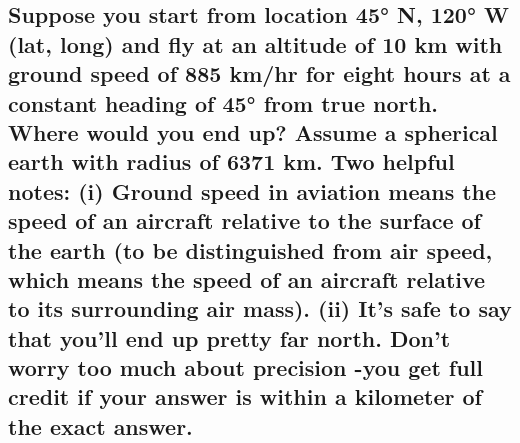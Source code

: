 \documentclass[12pt]{article}
\begin{document}
  \subsection
  {
    Suppose you start from location 45° N, 120° W (lat, long) and fly at an 
    altitude of 10 km with ground speed of 885 km/hr for eight hours at a 
    constant heading of 45° from true north. Where would you end up? Assume a 
    spherical earth with radius of 6371 km. Two helpful notes: (i) Ground speed 
    in aviation means the speed of an aircraft relative to the surface of the 
    earth (to be distinguished from air speed, which means the speed of an 
    aircraft relative to its surrounding air mass). (ii) It's safe to say that 
    you'll end up pretty far north. Don't worry too much about precision -you 
    get full credit if your answer is within a kilometer of the exact answer.
  }
\end{document}
